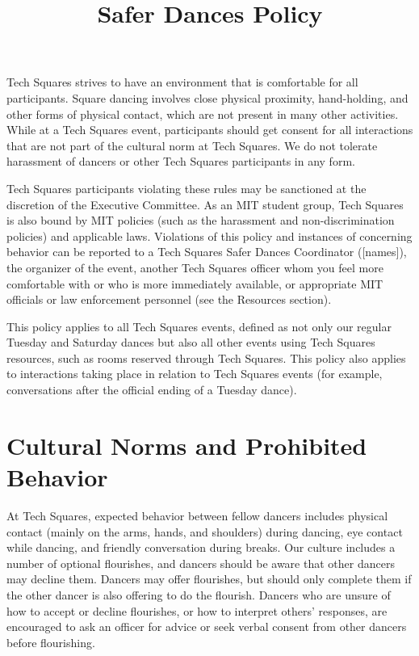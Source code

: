 \documentclass{article}
\title{Safer Dances Policy}
\date{}
\begin{document}
\maketitle

Tech Squares strives to have an environment that is comfortable for all participants. Square dancing involves close physical proximity, hand-holding, and other forms of physical contact, which are not present in many other activities. While at a Tech Squares event, participants should get consent for all interactions that are not part of the cultural norm at Tech Squares. We do not tolerate harassment of dancers or other Tech Squares participants in any form.

Tech Squares participants violating these rules may be sanctioned at the discretion of the Executive Committee. As an MIT student group, Tech Squares is also bound by MIT policies (such as the harassment and non-discrimination policies) and applicable laws. Violations of this policy and instances of concerning behavior can be reported to a Tech Squares Safer Dances Coordinator ([names]), the organizer of the event, another Tech Squares officer whom you feel more comfortable with or who is more immediately available, or appropriate MIT officials or law enforcement personnel (see the Resources section).

This policy applies to all Tech Squares events, defined as not only our regular Tuesday and Saturday dances but also all other events using Tech Squares resources, such as rooms reserved through Tech Squares. This policy also applies to interactions taking place in relation to Tech Squares events (for example, conversations after the official ending of a Tuesday dance).

\section{Cultural Norms and Prohibited Behavior}

At Tech Squares, expected behavior between fellow dancers includes physical contact (mainly on the arms, hands, and shoulders) during dancing, eye contact while dancing, and friendly conversation during breaks. Our culture includes a number of optional flourishes, and dancers should be aware that other dancers may decline them. Dancers may offer flourishes, but should only complete them if the other dancer is also offering to do the flourish. Dancers who are unsure of how to accept or decline flourishes, or how to interpret others’ responses, are encouraged to ask an officer for advice or seek verbal consent from other dancers before flourishing. 
\end{document}
